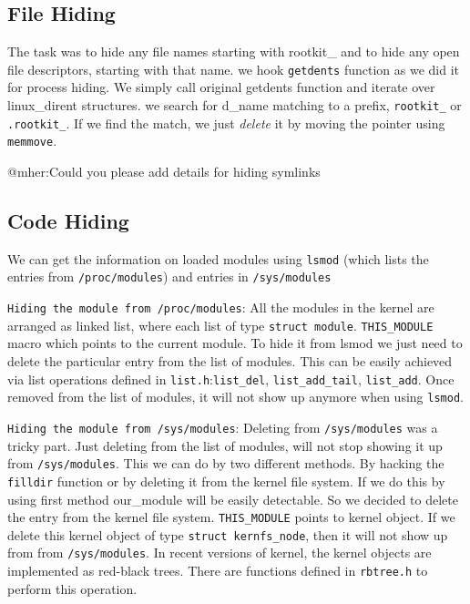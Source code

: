 \documentclass[10pt, letterpaper]{scrartcl}
\begin{document}
\subsection{File Hiding}
The task was to hide any file names starting with rootkit\_ and to hide any open file descriptors, 
starting with that name. we hook \texttt{getdents} function as we did it for process hiding. 
We simply call original getdents function and iterate over linux\_dirent structures.
we search for d\_name matching to a prefix, \texttt{rootkit\_} or \texttt{.rootkit\_}. 
If we find the match, we just {\em delete} it by moving the pointer using \texttt{memmove}.

@mher:Could you please add details for hiding symlinks 

\subsection{Code Hiding}
We can get the information on loaded modules using \texttt{lsmod}
(which lists the entries from \texttt{/proc/modules}) and entries in \texttt{/sys/modules}

\texttt{Hiding the module from /proc/modules}: All the modules in the kernel are arranged as linked list, 
where each list of type \texttt{struct module}. \texttt{THIS\_MODULE} macro which points to the current module. 
To hide it from lsmod we just need to delete the particular entry from the list of modules. 
This can be easily achieved via list operations defined in \texttt{list.h}:\texttt{list\_del}, 
\texttt{list\_add\_tail}, \texttt{list\_add}. Once removed from the list of modules, 
it will not show up anymore when using \texttt{lsmod}. 

\texttt{Hiding the module from /sys/modules}: Deleting from \texttt{/sys/modules} was a tricky part. 
Just deleting from the list of modules, will not stop showing it up from \texttt{/sys/modules}.
This we can do by two different methods. By hacking the \texttt{filldir} function or by deleting it from the 
kernel file system. If we do this by using first method our\_module will be easily detectable. 
So we decided to delete the entry from the kernel file system. \texttt{THIS\_MODULE} points to kernel object. 
If we delete this kernel object of type \texttt{struct kernfs\_node}, then it will not show up from from \texttt{/sys/modules}. 
In recent versions of kernel, the kernel objects are implemented as red-black trees. 
There are functions defined in \texttt{rbtree.h} to perform this operation. 
\end{document}
